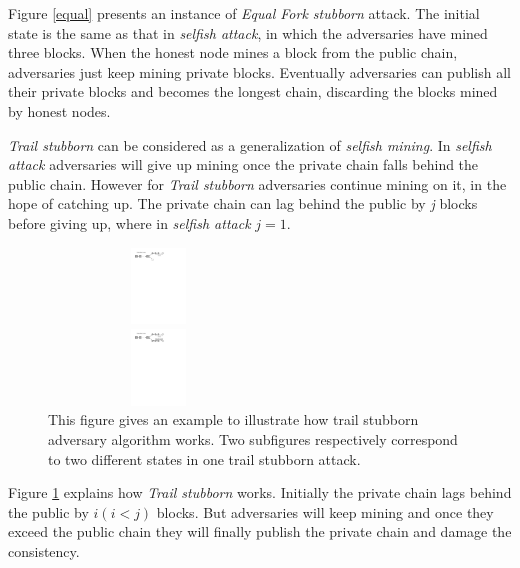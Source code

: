 \documentclass{llncs}
\begin{document}
Figure \ref{equal} presents an instance of \emph{Equal Fork stubborn} attack. The initial state is the same as that in \emph{selfish attack}, in which the adversaries have mined three blocks. When the honest node mines a block from the public chain, adversaries just keep mining private blocks. Eventually adversaries can publish all their private blocks and becomes the longest chain, discarding the blocks mined by honest nodes.

\emph{Trail stubborn} can be considered as a generalization of \emph{selfish mining}. In \emph{selfish attack} adversaries will give up mining once the private chain falls behind the public chain. However for \emph{Trail stubborn} adversaries continue mining on it, in the hope of catching up. The private chain can lag behind the public by \emph{j} blocks before giving up, where in \emph{selfish attack} $j = 1$.
\vspace{-7mm}
\begin{figure}[!htbp]
\begin{minipage}[t]{0.5\linewidth}
\centering
\includegraphics[height=0.8in, width=2.3in]{Figures/Trail-1.pdf}

\end{minipage}%
\begin{minipage}[t]{0.5\linewidth}
\centering
\includegraphics[height=0.8in, width=2.3in]{Figures/Trail-2.pdf}

\end{minipage}

\vspace{0mm}
\setlength{\belowcaptionskip}{-10pt}
\caption{This figure gives an example to illustrate how trail stubborn adversary algorithm works. Two subfigures respectively correspond to two different states in one trail stubborn attack.}
\label{trail}
\vspace{-3mm}
\end{figure}

Figure \ref{trail} explains how \emph{Trail stubborn} works. Initially the private chain lags behind the public by  $i (i < j)$ blocks. But adversaries will keep mining and once they exceed the public chain they will finally publish the private chain and damage the consistency.
\end{document}
